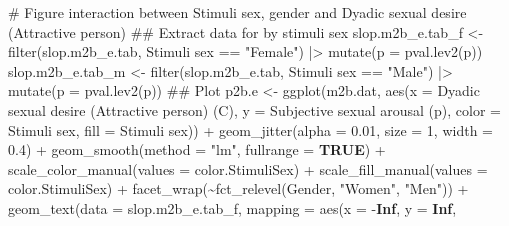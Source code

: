 \documentclass[
  bookmarksnumbered]{article}
\newenvironment{Shaded}{\begin{snugshade}}{\end{snugshade}}
\newcommand{\AttributeTok}[1]{\textcolor[rgb]{0.80,0.80,0.80}{#1}}
\newcommand{\CommentTok}[1]{\textcolor[rgb]{0.50,0.62,0.50}{#1}}
\newcommand{\ConstantTok}[1]{\textcolor[rgb]{0.86,0.64,0.64}{\textbf{#1}}}
\newcommand{\DecValTok}[1]{\textcolor[rgb]{0.86,0.86,0.80}{#1}}
\newcommand{\DocumentationTok}[1]{\textcolor[rgb]{0.50,0.62,0.50}{#1}}
\newcommand{\FloatTok}[1]{\textcolor[rgb]{0.75,0.75,0.82}{#1}}
\newcommand{\FunctionTok}[1]{\textcolor[rgb]{0.94,0.94,0.56}{#1}}
\newcommand{\NormalTok}[1]{\textcolor[rgb]{0.80,0.80,0.80}{#1}}
\newcommand{\OtherTok}[1]{\textcolor[rgb]{0.94,0.94,0.56}{#1}}
\newcommand{\SpecialCharTok}[1]{\textcolor[rgb]{0.86,0.64,0.64}{#1}}
\newcommand{\StringTok}[1]{\textcolor[rgb]{0.80,0.58,0.58}{#1}}
\begin{document}
\begin{Shaded}
\begin{Highlighting}[]
\CommentTok{\# Figure interaction between Stimuli sex, gender and Dyadic sexual desire (Attractive person)}
\DocumentationTok{\#\# Extract data for by stimuli sex}
\NormalTok{slop.m2b\_e.tab\_f }\OtherTok{\textless{}{-}} \FunctionTok{filter}\NormalTok{(slop.m2b\_e.tab, }\StringTok{\textasciigrave{}}\AttributeTok{Stimuli sex}\StringTok{\textasciigrave{}} \SpecialCharTok{==} \StringTok{"Female"}\NormalTok{) }\SpecialCharTok{|\textgreater{}}
  \FunctionTok{mutate}\NormalTok{(}\AttributeTok{p =} \FunctionTok{pval.lev2}\NormalTok{(p))}
\NormalTok{slop.m2b\_e.tab\_m }\OtherTok{\textless{}{-}} \FunctionTok{filter}\NormalTok{(slop.m2b\_e.tab, }\StringTok{\textasciigrave{}}\AttributeTok{Stimuli sex}\StringTok{\textasciigrave{}} \SpecialCharTok{==} \StringTok{"Male"}\NormalTok{) }\SpecialCharTok{|\textgreater{}}
  \FunctionTok{mutate}\NormalTok{(}\AttributeTok{p =} \FunctionTok{pval.lev2}\NormalTok{(p))}
\DocumentationTok{\#\# Plot}
\NormalTok{p2b.e }\OtherTok{\textless{}{-}} \FunctionTok{ggplot}\NormalTok{(m2b.dat, }\FunctionTok{aes}\NormalTok{(}\AttributeTok{x =} \StringTok{\textasciigrave{}}\AttributeTok{Dyadic sexual desire (Attractive person) (C)}\StringTok{\textasciigrave{}}\NormalTok{,}
                             \AttributeTok{y =} \StringTok{\textasciigrave{}}\AttributeTok{Subjective sexual arousal (p)}\StringTok{\textasciigrave{}}\NormalTok{,}
                             \AttributeTok{color =} \StringTok{\textasciigrave{}}\AttributeTok{Stimuli sex}\StringTok{\textasciigrave{}}\NormalTok{, }\AttributeTok{fill =} \StringTok{\textasciigrave{}}\AttributeTok{Stimuli sex}\StringTok{\textasciigrave{}}\NormalTok{)) }\SpecialCharTok{+}
  \FunctionTok{geom\_jitter}\NormalTok{(}\AttributeTok{alpha =} \FloatTok{0.01}\NormalTok{, }\AttributeTok{size =} \DecValTok{1}\NormalTok{, }\AttributeTok{width =} \FloatTok{0.4}\NormalTok{) }\SpecialCharTok{+}
  \FunctionTok{geom\_smooth}\NormalTok{(}\AttributeTok{method =} \StringTok{"lm"}\NormalTok{, }\AttributeTok{fullrange =} \ConstantTok{TRUE}\NormalTok{) }\SpecialCharTok{+}
  \FunctionTok{scale\_color\_manual}\NormalTok{(}\AttributeTok{values =}\NormalTok{ color.StimuliSex) }\SpecialCharTok{+}
  \FunctionTok{scale\_fill\_manual}\NormalTok{(}\AttributeTok{values =}\NormalTok{ color.StimuliSex) }\SpecialCharTok{+}
  \FunctionTok{facet\_wrap}\NormalTok{(}\SpecialCharTok{\textasciitilde{}}\FunctionTok{fct\_relevel}\NormalTok{(Gender, }\StringTok{"Women"}\NormalTok{, }\StringTok{"Men"}\NormalTok{)) }\SpecialCharTok{+}
  \FunctionTok{geom\_text}\NormalTok{(}\AttributeTok{data =}\NormalTok{ slop.m2b\_e.tab\_f,}
            \AttributeTok{mapping =} \FunctionTok{aes}\NormalTok{(}\AttributeTok{x =} \SpecialCharTok{{-}}\ConstantTok{Inf}\NormalTok{, }\AttributeTok{y =} \ConstantTok{Inf}\NormalTok{,}

\end{Highlighting}
\end{Shaded}
\end{document}
